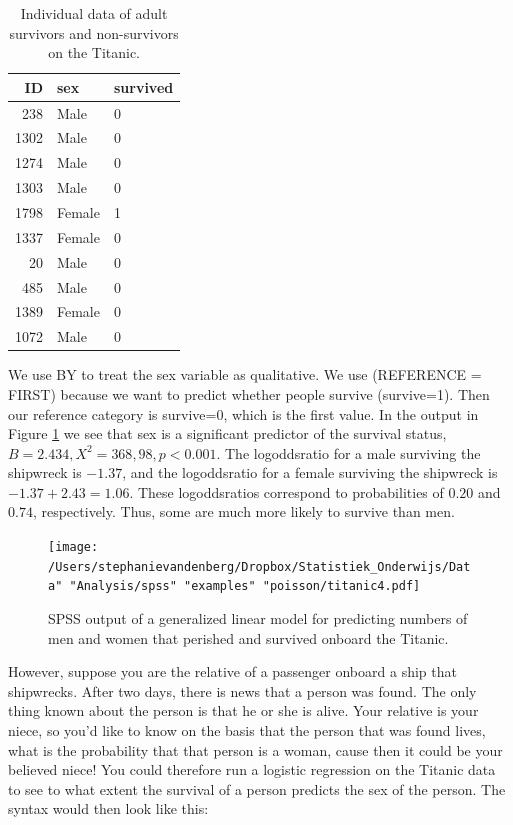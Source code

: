\documentclass[]{book}\usepackage[]{graphicx}\usepackage[]{color}
\begin{document}
\begin{table}[ht]
\centering
\caption{Individual data of adult survivors and non-survivors on the Titanic.} 
\label{tab:gen_28}
\begin{tabular}{rll}
  \hline
ID & sex & survived \\ 
  \hline
238 & Male & 0 \\ 
  1302 & Male & 0 \\ 
  1274 & Male & 0 \\ 
  1303 & Male & 0 \\ 
  1798 & Female & 1 \\ 
  1337 & Female & 0 \\ 
  20 & Male & 0 \\ 
  485 & Male & 0 \\ 
  1389 & Female & 0 \\ 
  1072 & Male & 0 \\ 
   \hline
\end{tabular}
\end{table}




We use BY to treat the sex variable as qualitative. We use (REFERENCE = FIRST) because we want to predict whether people survive (survive=1). Then our reference category is survive=0, which is the first value.
In the output in Figure \ref{fig:titanic4} we see that sex is a significant predictor of the survival status, $B=2.434, X^2=368,98, p<0.001$. The logoddsratio for a male surviving the shipwreck is $-1.37$, and the logoddsratio for a female surviving the shipwreck is $-1.37+2.43=1.06$. These logoddsratios correspond to probabilities of $0.20$ and $0.74$, respectively. Thus, some are much more likely to survive than men.


\begin{figure}[h]
    \begin{center}
       \texttt{[image: /Users/stephanievandenberg/Dropbox/Statistiek\_Onderwijs/Data" "Analysis/spss" "examples" "poisson/titanic4.pdf]}
    \end{center}
     \caption{SPSS output of a generalized linear model for predicting numbers of men and women that perished and survived onboard the Titanic.}
    \label{fig:titanic4}
\end{figure}

However, suppose you are the relative of a passenger onboard a ship that shipwrecks. After two days, there is news that a person was found. The only thing known about the person is that he or she is alive. Your relative is your niece, so you'd like to know on the basis that the person that was found lives, what is the probability that that person is a woman, cause then it could be your believed niece! You could therefore run a logistic regression on the Titanic data to see to what extent the survival of a person predicts the sex of the person. The syntax would then look like this:
\end{document}
